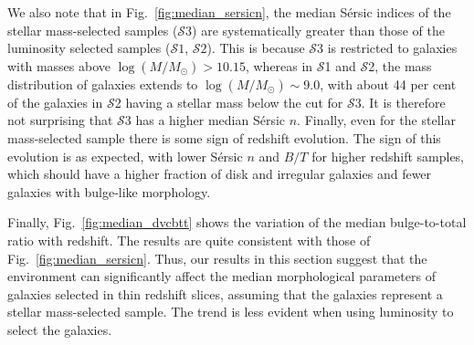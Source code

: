 \documentclass[twocolumn,useAMS,usenatbib]{mn2e}
\newcommand{\sersic}{S\'{e}rsic }
\newcommand{\s}{\ensuremath{\mathcal{S}}}
\begin{document}
We also note that in Fig.~\ref{fig:median_sersicn}, the median \sersic
indices of the stellar mass-selected samples (\s$3$) are
systematically greater than those of the luminosity selected samples
(\s$1$, \s$2$).  
This is because \s3 is restricted to galaxies with masses above $\log(M/M_\odot) > 10.15$, whereas in \s1 and \s2, the mass distribution of galaxies extends to $\log(M/M_\odot) \sim 9.0$,
with about 44 per cent of the galaxies in \s2 having a stellar mass below the cut for \s3.
It is therefore not surprising that \s3 has a higher median \sersic $n$.  Finally, even for
the stellar mass-selected sample there is some sign of redshift
evolution.  The sign of this evolution is as expected, with lower
\sersic $n$ and $B/T$ for higher redshift samples, which should have a
higher fraction of disk and irregular galaxies and fewer galaxies with
bulge-like morphology.
 
Finally, Fig.~\ref{fig:median_dvcbtt} shows the variation of the median
bulge-to-total ratio with redshift. The results are quite consistent
with those of Fig.~\ref{fig:median_sersicn}. 
Thus, our results in this section suggest that the 
environment can significantly affect the median morphological
parameters of galaxies selected in thin redshift
slices, assuming that the galaxies represent a stellar mass-selected
sample.  The trend is less evident when using luminosity to select the
galaxies.
\end{document}
